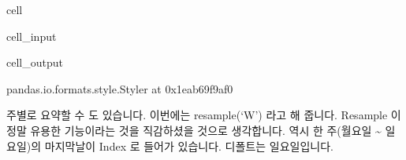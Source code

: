 \documentclass[letterpaper,10pt,english]{jupyterBook}
\begin{document}
\begin{sphinxuseclass}{cell}\begin{sphinxVerbatimInput}

\begin{sphinxuseclass}{cell_input}
\begin{sphinxVerbatim}[commandchars=\\\{\}]
   
  
\PYG{p}{[}\PYG{p}{]}\PYG{p}{[}\PYG{p}{]} 
\end{sphinxVerbatim}

\end{sphinxuseclass}\end{sphinxVerbatimInput}
\begin{sphinxVerbatimOutput}

\begin{sphinxuseclass}{cell_output}
\begin{sphinxVerbatim}[commandchars=\\\{\}]
\PYGZlt{}pandas.io.formats.style.Styler at 0x1eab69f9af0\PYGZgt{}
\end{sphinxVerbatim}

\end{sphinxuseclass}\end{sphinxVerbatimOutput}

\end{sphinxuseclass}
\sphinxAtStartPar
주별로 요약할 수 도 있습니다. 이번에는 resample(‘W’) 라고 해 줍니다. Resample 이 정말 유용한 기능이라는 것을 직감하셨을 것으로 생각합니다. 역시 한 주(월요일 \textasciitilde{} 일요일)의 마지막날이 Index 로 들어가 있습니다. 디폴트는 일요일입니다.
\end{document}
